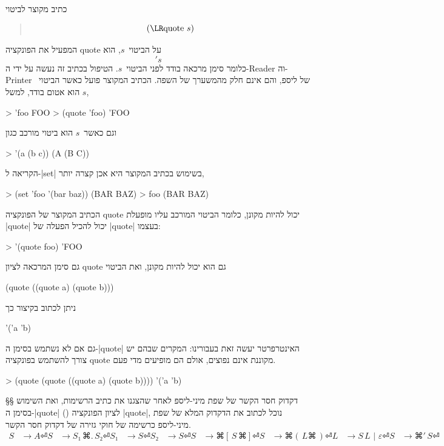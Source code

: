 כתיב מקוצר לביטוי
\begin{LTR}
\begin{quote}
  \setLTR \[
    \text{(\E|quote~$s$|)}
\] \end{quote}
\end{LTR}
המפעיל את הפונקציה quote על הביטוי~$s$, הוא \[
  's
\] כלומר סימן מרכאה בודד
לפני הביטוי~$s$. הטיפול בכתיב זה נעשה על ידי
ה-Reader וה-Printer של ליספ, והם אינם חלק מהמשערך של השפה.
הכתיב המקוצר פועל כאשר הביטוי~$s$ הוא אטום בודד, למשל,
\begin{LISP}
> 'foo
FOO
> (quote 'foo)
'FOO
\end{LISP}
וגם כאשר~$s$ הוא ביטוי מורכב כגון
\begin{LISP}
> '(a (b c))
(A (B C))
\end{LISP}
הקריאה ל-\E|set| בשימוש בכתיב המקוצר היא אכן קצרה יותר,
\begin{LISP}
> (set 'foo '(bar baz))
(BAR BAZ)
> foo
(BAR BAZ)
\end{LISP}
הכתיב המקוצר של הפונקציה quote יכול להיות מקונן, כלומר הביטוי המורכב עליו
מופעלת \E|quote| יכול להכיל הפעלה של \E|quote| בעצמו:
\begin{LISP}
> '(quote foo)
'FOO
\end{LISP}
גם סימן המרכאה לציון quote גם הוא יכול להיות מקונן, ואת הביטוי
\begin{LISP}
(quote ((quote a) (quote b)))
\end{LISP}
ניתן לכתוב בקיצור כך
\begin{LISP}
'('a 'b)
\end{LISP}
גם אם לא נשתמש בסימן ה-\E|quote| האינטרפרטר יעשה זאת בעבורינו:
המקרים שבהם יש צורך להשתמש בפונקציה quote מקוננת אינם נפוצים, אולם הם מופיעים
מדי פעם.
\begin{LISP}
> (quote (quote ((quote a) (quote b))))
'('a 'b)
\end{LISP}

§§ דקדוק חסר הקשר של שפת מיני-ליספ
לאחר שהצגנו את כתיב הרשימות, ואת השימוש בסימן ה-\E|quote| () לציון
הפונקציה \E|quote|, נוכל לכתוב את הדקדוק המלא של שפת מיני-ליספ כרשימה של חוקי
גזירה של דקדוק חסר הקשר.
\begin{equation}
  \label{eq:ambigious}
  \begin{split}
    S &→  A ⏎
    S &→  S₁\, ⌘.\, S₂⏎
    S₁&→  S ⏎
    S₂&→  S ⏎
    S &→  ⌘[\, S\, ⌘] ⏎
    S &→  ⌘(\, L ⌘\,) ⏎
    L &→  S \, L\,\, |\, \,ε ⏎
    S &→  ⌘'\,S ⏎
  \end{split}
\end{equation}

